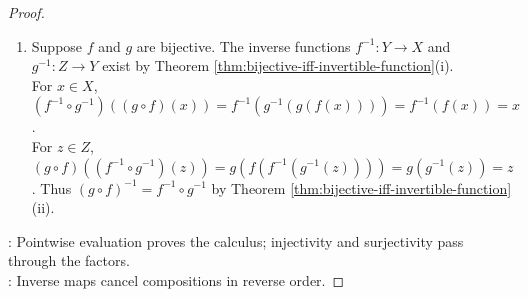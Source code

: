 \begin{proposition}
\begin{proof}
\begin{enumerate}[label=(\roman*)]
Thus $(g\circ f)(x)=z$, so $g\circ f$ is surjective and therefore bijective.
\item Suppose $f$ and $g$ are bijective. The inverse functions $f^{-1}:Y\to X$ and $g^{-1}:Z\to Y$ exist by Theorem \ref{thm:bijective-iff-invertible-function}(i).\\
For $x\in X$, $(f^{-1}\circ g^{-1})((g\circ f)(x))=f^{-1}(g^{-1}(g(f(x))))=f^{-1}(f(x))=x$.\\
For $z\in Z$, $(g\circ f)((f^{-1}\circ g^{-1})(z))=g(f(f^{-1}(g^{-1}(z))))=g(g^{-1}(z))=z$. Thus $(g\circ f)^{-1}=f^{-1}\circ g^{-1}$ by Theorem \ref{thm:bijective-iff-invertible-function}(ii).
\end{enumerate}
: Pointwise evaluation proves the calculus; injectivity and surjectivity pass through the factors.\\
: Inverse maps cancel compositions in reverse order.
\end{proof}
\end{proposition}
